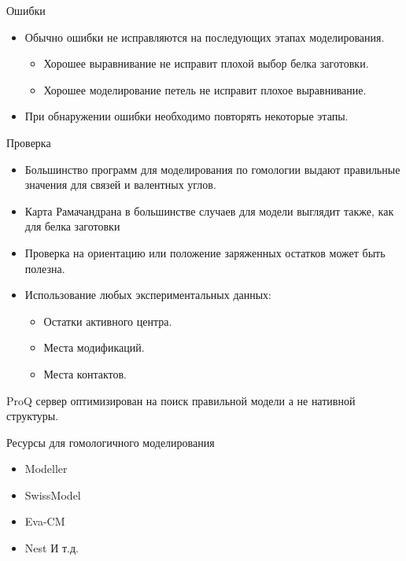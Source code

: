\begin{frame}
{Ошибки}
	\begin{itemize}
		\item
			Обычно  ошибки не исправляются на последующих этапах моделирования.
			\begin{itemize}
		\item
			Хорошее выравнивание не исправит плохой выбор белка заготовки.
		\item
			Хорошее моделирование петель не исправит плохое выравнивание.
			\end{itemize}
		\item
			При обнаружении ошибки необходимо повторять некоторые этапы.
	\end{itemize}
\end{frame}
\begin{frame}
{Проверка}
	\begin{itemize}
		\item
			 Большинство программ для моделирования по гомологии выдают правильные значения для связей и валентных  углов.
		 \item
			  Карта Рамачандрана в большинстве случаев для модели выглядит также, как для белка заготовки
		  \item
			   Проверка на ориентацию или положение заряженных остатков может быть полезна.
		   \item
			    Использование любых экспериментальных данных:
				\begin{itemize}
			\item
				Остатки активного центра.
			\item
				Места модификаций.
			\item
				Места контактов.
				\end{itemize}
	\end{itemize}
	\vspace{0.5cm}	
				ProQ сервер оптимизирован на поиск правильной модели а не нативной структуры.
\end{frame}
\begin{frame}
{Ресурсы для гомологичного моделирования}
	\begin{itemize}
		\item
			 Modeller
			 \vspace{.5cm}
		 \item	 
			 SwissModel
			 \vspace{.5cm}
		 \item
			 Eva-CM
			 \vspace{.5cm}
		 \item
			 Nest
			 И т.д.
	\end{itemize}
\end{frame}

